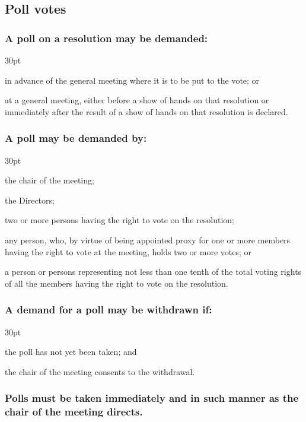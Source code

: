 \documentclass[12pt]{article}
\def\clauseindent{30pt}
\newenvironment{subindentpara}{\begin{adjustwidth}{\clauseindent}{}\begin{hanginglist}}{\end{hanginglist}\end{adjustwidth}}
\begin{document}
\subsection{Poll votes}
\subsubsection{A poll on a resolution may be demanded:}
\begin{subindentpara}
    \item in advance of the general meeting where it is to be put to the vote; or
    \item at a general meeting, either before a show of hands on that resolution or immediately after the result of a show of hands on that resolution is declared.
\end{subindentpara}
\subsubsection{A poll may be demanded by:}
\begin{subindentpara}
    \item the chair of the meeting;
    \item the Directors;
    \item two or more persons having the right to vote on the resolution;
    \item any person, who, by virtue of being appointed proxy for one or more members having the right to vote at the meeting, holds two or more votes; or
    \item a person or persons representing not less than one tenth of the total voting rights of all the members having the right to vote on the resolution.
\end{subindentpara}
\subsubsection{A demand for a poll may be withdrawn if:}
\begin{subindentpara}
    \item the poll has not yet been taken; and
    \item the chair of the meeting consents to the withdrawal.
\end{subindentpara}
\subsubsection{Polls must be taken immediately and in such manner as the chair of the meeting directs.}
\end{document}
